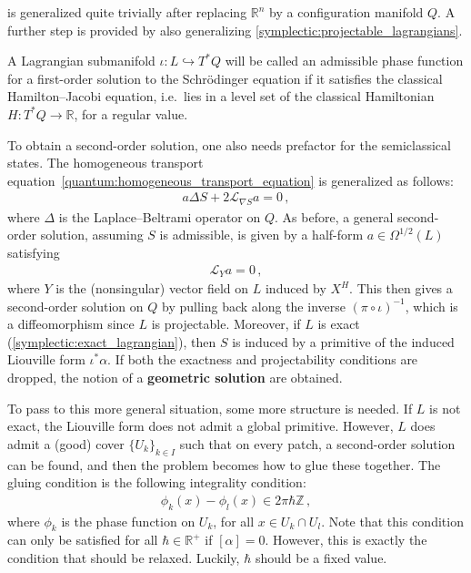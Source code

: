      is generalized quite trivially after replacing $\mathbb{R}^n$ by a configuration manifold $Q$. A further step is provided by also generalizing \cref{symplectic:projectable_lagrangians}.
    \begin{property}
        A Lagrangian submanifold $\iota:L\hookrightarrow T^*Q$ will be called an admissible phase function for a first-order solution to the Schr\"odinger equation if it satisfies the classical Hamilton--Jacobi equation, i.e.~lies in a level set of the classical Hamiltonian $H:T^*Q\rightarrow\mathbb{R}$, for a regular value.
    \end{property}

    To obtain a second-order solution, one also needs prefactor for the semiclassical states. The homogeneous transport equation~\eqref{quantum:homogeneous_transport_equation} is generalized as follows:
    \begin{gather}
        a\Delta S + 2\mathcal{L}_{\nabla S}a = 0\,,
    \end{gather}
    where $\Delta$ is the Laplace--Beltrami operator on $Q$. As before, a general second-order solution, assuming $S$ is admissible, is given by a half-form $a\in\Omega^{1/2}(L)$ satisfying
    \begin{gather}
        \mathcal{L}_Ya = 0\,,
    \end{gather}
    where $Y$ is the (nonsingular) vector field on $L$ induced by $X^H$. This then gives a second-order solution on $Q$ by pulling back along the inverse $(\pi\circ\iota)^{-1}$, which is a diffeomorphism since $L$ is projectable. Moreover, if $L$ is exact (\cref{symplectic:exact_lagrangian}), then $S$ is induced by a primitive of the induced Liouville form $\iota^*\alpha$. If both the exactness and projectability conditions are dropped, the notion of a \textbf{geometric solution} are obtained.

    To pass to this more general situation, some more structure is needed. If $L$ is not exact, the Liouville form does not admit a global primitive. However, $L$ does admit a (good) cover $\{U_k\}_{k\in I}$ such that on every patch, a second-order solution can be found, and then the problem becomes how to glue these together. The gluing condition is the following integrality condition:
    \begin{gather}
        \label{quantum:integrality_condition}
        \phi_k(x)-\phi_l(x)\in2\pi\hbar\mathbb{Z}\,,
    \end{gather}
    where $\phi_k$ is the phase function on $U_k$, for all $x\in U_k\cap U_l$. Note that this condition can only be satisfied for all $\hbar\in\mathbb{R}^+$ if $[\alpha]=0$. However, this is exactly the condition that should be relaxed. Luckily, $\hbar$ should be a fixed value.
    
